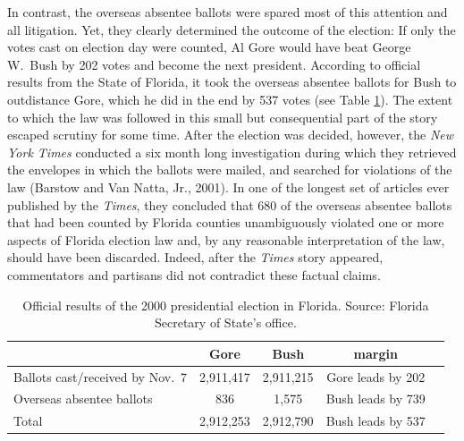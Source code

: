 \documentclass[11pt,titlepage]{article}
\begin{document}
In contrast, the overseas absentee ballots were spared most of this
attention and all litigation.  Yet, they clearly determined the
outcome of the election: If only the votes cast on election day were
counted, Al Gore would have beat George W.\ Bush by 202 votes and
become the next president.  According to official results from the
State of Florida, it took the overseas absentee ballots for Bush to
outdistance Gore, which he did in the end by 537 votes (see Table
\ref{tb:official}).  The extent to which the law was followed in this
small but consequential part of the story escaped scrutiny for some
time. After the election was decided, however, the \emph{New York
  Times} conducted a six month long investigation during which they
retrieved the envelopes in which the ballots were mailed, and searched
for violations of the law (Barstow and Van Natta, Jr., 2001).  In one
of the longest set of articles ever published by the \emph{Times},
they concluded that 680 of the overseas absentee ballots that had been
counted by Florida counties unambiguously violated one or more aspects
of Florida election law and, by any reasonable interpretation of the
law, should have been discarded.  Indeed, after the \emph{Times} story
appeared, commentators and partisans did not contradict these factual
claims.
\begin{table}[t]
\begin{center}
\begin{tabular}{lcccc}
                               & Gore      & Bush      & margin \\ \hline 
Ballots cast/received by Nov.\ 7&2,911,417 & 2,911,215 & Gore leads by 202 \\
Overseas absentee ballots       &      836 &     1,575 & Bush leads by 739 \\
\hline
Total                          & 2,912,253 & 2,912,790 & Bush leads by 537 \\
\end{tabular} \caption{Official results of the 2000 presidential
  election in Florida.  Source: Florida Secretary of State's office.}
\label{tb:official}
\end{center}
\end{table} 
\end{document}
